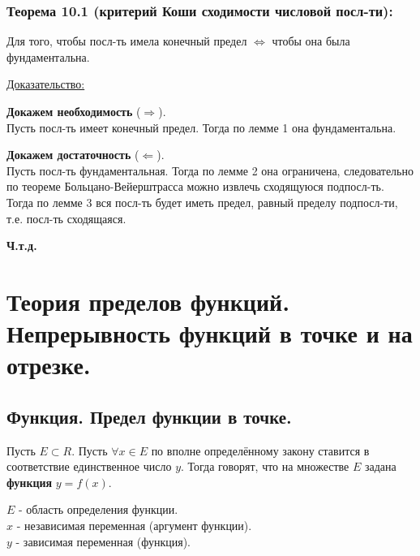 \documentclass[12pt]{article}
\begin{document}
    \subsubsection*{Теорема 10.1 (критерий Коши сходимости числовой посл-ти):}
    Для того, чтобы посл-ть имела конечный предел $\Leftrightarrow$ чтобы она была фундаментальна.\par\noindent
    \underline{Доказательство:}\par
    \begin{adjustwidth}{1.5em}{1.5em}
        \textbf{Докажем необходимость} ($\Rightarrow$).\\
        Пусть посл-ть имеет конечный предел. Тогда по лемме 1 она фундаментальна.\par\noindent
        \textbf{Докажем достаточность} ($\Leftarrow$).\\
        Пусть посл-ть фундаментальная. Тогда по лемме 2 она ограничена, следовательно по теореме Больцано-Вейерштрасса можно извлечь сходящуюся подпосл-ть.\\
        Тогда по лемме 3 вся посл-ть будет иметь предел, равный пределу подпосл-ти, т.е. посл-ть сходящаяся.
        \begin{center}
            \textbf{Ч.т.д.}
        \end{center}
    \end{adjustwidth}

    \section{Теория пределов функций. Непрерывность функций в точке и на отрезке.}
    \subsection{Функция. Предел функции в точке.}
    \noindent Пусть $E \subset R$. Пусть $\forall x \in E$ по вполне определённому закону ставится в соответствие единственное число $y$. Тогда говорят, что на множестве $E$ задана \textbf{функция} $y = f(x)$.\par\noindent
    $E$ - область определения функции.\\
    $x$ - независимая переменная (аргумент функции).\\
    $y$ - зависимая переменная (функция).
\end{document}

